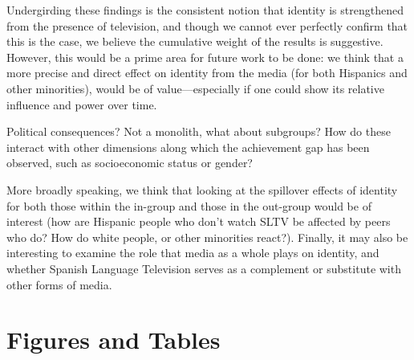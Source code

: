 \documentclass[11pt]{article}
\begin{document}
Undergirding these findings is the consistent notion that identity is strengthened from the presence of television, and though we cannot ever perfectly confirm that this is the case, we believe the cumulative weight of the results is suggestive. However, this would be a prime area for future work to be done: we think that a more precise and direct effect on identity from the media (for both Hispanics and other minorities), would be of value---especially if one could show its relative influence and power over time.



Political consequences?
Not a monolith, what about subgroups? How do these interact with other dimensions along which the achievement gap has been observed, such as socioeconomic status or gender?

More broadly speaking, we think that looking at the spillover effects of identity for both those within the in-group and those in the out-group would be of interest (how are Hispanic people who don't watch SLTV be affected by peers who do? How do white people, or other minorities react?). Finally, it may also be interesting to examine the role that media as a whole plays on identity, and whether Spanish Language Television serves as a complement or substitute with other forms of media.


\clearpage
\pagebreak

\begin{singlespace}
\begin{scriptsize}

%
{}
\end{scriptsize}
\end{singlespace}

\pagebreak
\clearpage

\section*{Figures and Tables}

\end{document}
